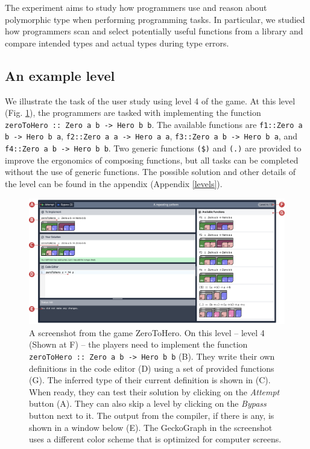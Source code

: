 \documentclass[preprint,12pt]{elsarticle}
\begin{document}
The experiment aims to study how programmers use and reason about polymorphic type when performing programming tasks. In particular, we studied how programmers scan and select potentially useful functions from a library and compare intended types and actual types during type errors.


\subsection{An example level}
We illustrate the task of the user study using level 4 of the game. At this level (Fig. \ref{fig:level-example}), the programmers are tasked with implementing the function \texttt{ zeroToHero :: Zero a b -> Hero b b}. The available functions are \texttt{f1::Zero a b -> Hero b a}, \texttt{f2::Zero a a -> Hero a a}, \texttt{f3::Zero a b -> Hero b a}, and \texttt{f4::Zero a b -> Hero b b}. Two generic functions \texttt{(\$)} and \texttt{(.)} are provided to improve the ergonomics of composing functions, but all tasks can be completed without the use of generic functions. The possible solution and other details of the level can be found in the appendix (Appendix \ref{levels}).


\begin{figure}[h]
  \includegraphics[width=\linewidth]{figures/GamePlay}
  \caption{\label{fig:level-example} A screenshot from  the game ZeroToHero. On this level -- level 4 (Shown at F) -- the players need to implement the function \texttt{ zeroToHero :: Zero a b -> Hero b b} (B). They write their own definitions in the code editor (D) using a set of provided functions (G). The inferred type of their current definition is shown in (C). When ready, they can test their solution by clicking on the \textit{Attempt} button (A). They can also skip a level by clicking on the \textit{Bypass} button next to it. The output from the compiler, if there is any, is shown in a window below (E). The GeckoGraph in the screenshot uses a different color scheme that is optimized for computer screens.}
\end{figure}
\end{document}
